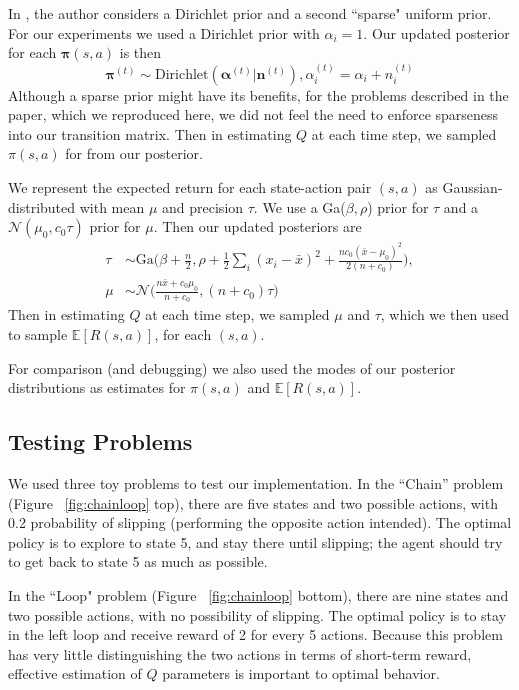\documentclass[10pt, twocolumn, twoside]{article}
\begin{document}
In \cite{strens}, the author considers a Dirichlet prior and a second ``sparse"
uniform prior. For our experiments we used a Dirichlet prior with $\alpha_i = 1$.
Our updated posterior for each $\mathbf{\pi}(s, a)$ is then
\begin{equation*}
\mathbf{\pi}^{(t)} \sim \textrm{Dirichlet}(\mathbf{\alpha}^{(t)}| \mathbf{n}^{(t)}),
\alpha^{(t)}_i = \alpha_i + n_i^{(t)}
\end{equation*}
Although a sparse prior might have its benefits, for the problems described in the paper,
which we reproduced here, we did not feel the need to enforce sparseness into our
transition matrix. Then in estimating $Q$ at each time step, we sampled $\pi(s, a)$ for
from our posterior.

We represent the expected return for each state-action pair $(s, a)$ as Gaussian-
distributed with mean $\mu$ and precision $\tau$. We use a Ga($\beta,\rho$)
prior for $\tau$ and a $\mathcal{N}(\mu_0, c_0\tau)$ prior for $\mu$. Then our
updated posteriors are
\begin{align*}
\tau &\sim \textrm{Ga}\Big(\beta + \frac{n}{2}, \rho + \frac{1}{2}\sum_i(x_i - \bar{x})^2
+ \frac{nc_0(\bar{x}-\mu_0)^2}{2(n+c_0)}\Big),\\
\mu &\sim \mathcal{N}\Big(\frac{n\bar{x} + c_0\mu_0}{n + c_0}, (n+c_0)\tau\Big)
\end{align*}
Then in estimating $Q$ at each time step, we sampled $\mu$ and $\tau$, which we then used
to sample $\mathbb{E}[R(s, a)]$, for each $(s, a)$.

For comparison (and debugging) we also used the modes of our posterior distributions as
estimates for $\pi(s, a)$ and $\mathbb{E}[R(s,a)]$.

\subsection{Testing Problems}
We used three toy problems to test our implementation. In the ``Chain'' problem
(Figure ~\ref{fig:chainloop} top), there are five states and two possible actions, with 0.2
probability of slipping (performing the opposite action intended). The optimal
policy is to explore to state 5, and stay there until slipping; the agent should try
to get back to state 5 as much as possible.

In the ``Loop" problem (Figure ~\ref{fig:chainloop} bottom), there are nine states and
two possible actions, with no possibility of slipping. The optimal policy is to stay
in the left loop and receive reward of 2 for every 5 actions. Because this problem has
very little distinguishing the two actions in terms of short-term reward, effective
estimation of $Q$ parameters is important to optimal behavior.
\end{document}
